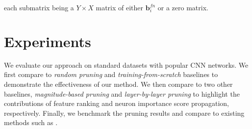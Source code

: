 \documentclass[10pt,twocolumn,letterpaper]{article}
\begin{document}
each submatrix being a $Y \times X$ matrix of either $\mathbf{b}_i^{fn}$ or a zero matrix. %

\section{Experiments}
We evaluate our approach on standard datasets with popular CNN networks. We first compare to \textit{random pruning} and \textit{training-from-scratch} baselines to demonstrate the effectiveness of our method. We then compare to two other baselines, \textit{magnitude-based pruning} and \textit{layer-by-layer pruning} to highlight the contributions of feature ranking and neuron importance score propagation, respectively.
Finally, we benchmark the pruning results and compare to existing methods such as \cite{PerforatedCNN,Tucker,learning,pruneweigth}.
\end{document}
